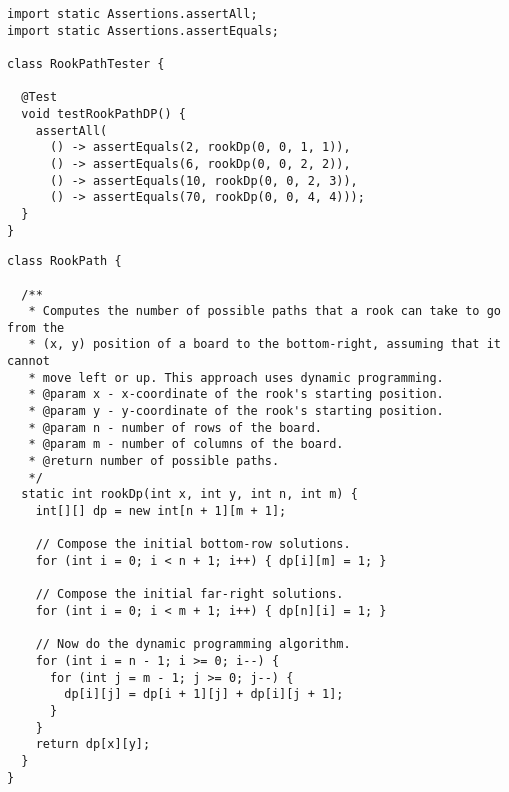 \begin{lstlisting}[language=MyJava]
import static Assertions.assertAll;
import static Assertions.assertEquals;

class RookPathTester {

  @Test
  void testRookPathDP() {
    assertAll(
      () -> assertEquals(2, rookDp(0, 0, 1, 1)),
      () -> assertEquals(6, rookDp(0, 0, 2, 2)),
      () -> assertEquals(10, rookDp(0, 0, 2, 3)),
      () -> assertEquals(70, rookDp(0, 0, 4, 4)));
  }
}
\end{lstlisting}

\begin{lstlisting}[language=MyJava]
class RookPath {

  /**
   * Computes the number of possible paths that a rook can take to go from the
   * (x, y) position of a board to the bottom-right, assuming that it cannot
   * move left or up. This approach uses dynamic programming.
   * @param x - x-coordinate of the rook's starting position.
   * @param y - y-coordinate of the rook's starting position.
   * @param n - number of rows of the board.
   * @param m - number of columns of the board.
   * @return number of possible paths.
   */
  static int rookDp(int x, int y, int n, int m) {
    int[][] dp = new int[n + 1][m + 1];

    // Compose the initial bottom-row solutions.
    for (int i = 0; i < n + 1; i++) { dp[i][m] = 1; }

    // Compose the initial far-right solutions.
    for (int i = 0; i < m + 1; i++) { dp[n][i] = 1; }

    // Now do the dynamic programming algorithm.
    for (int i = n - 1; i >= 0; i--) {
      for (int j = m - 1; j >= 0; j--) {
        dp[i][j] = dp[i + 1][j] + dp[i][j + 1];
      }
    }
    return dp[x][y];
  }
}
\end{lstlisting}